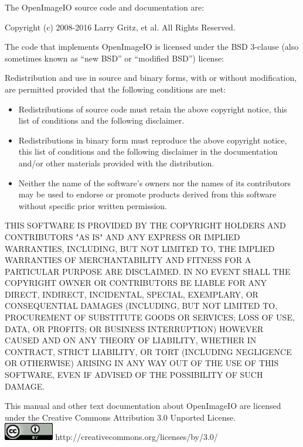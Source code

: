 \newpage
\label{speccopyr}

\vspace*{0.2in}

\noindent The OpenImageIO source code and
documentation are:

\vspace*{0.2in}

\noindent Copyright (c) 2008-2016 Larry Gritz, et al.
All Rights Reserved.

\vspace{0.5in}

The code that implements OpenImageIO is licensed under
the BSD 3-clause (also sometimes known as ``new BSD'' or
``modified BSD'') license:

\vspace{0.25in}

Redistribution and use in source and binary forms, with or without
modification, are permitted provided that the following conditions are
met:

\begin{itemize}
\item Redistributions of source code must retain the above copyright
  notice, this list of conditions and the following disclaimer.
\item Redistributions in binary form must reproduce the above copyright
  notice, this list of conditions and the following disclaimer in the
  documentation and/or other materials provided with the distribution.
\item Neither the name of the software's owners nor the names of its
  contributors may be used to endorse or promote products derived from
  this software without specific prior written permission.
\end{itemize}

THIS SOFTWARE IS PROVIDED BY THE COPYRIGHT HOLDERS AND CONTRIBUTORS
"AS IS" AND ANY EXPRESS OR IMPLIED WARRANTIES, INCLUDING, BUT NOT
LIMITED TO, THE IMPLIED WARRANTIES OF MERCHANTABILITY AND FITNESS FOR
A PARTICULAR PURPOSE ARE DISCLAIMED. IN NO EVENT SHALL THE COPYRIGHT
OWNER OR CONTRIBUTORS BE LIABLE FOR ANY DIRECT, INDIRECT, INCIDENTAL,
SPECIAL, EXEMPLARY, OR CONSEQUENTIAL DAMAGES (INCLUDING, BUT NOT
LIMITED TO, PROCUREMENT OF SUBSTITUTE GOODS OR SERVICES; LOSS OF USE,
DATA, OR PROFITS; OR BUSINESS INTERRUPTION) HOWEVER CAUSED AND ON ANY
THEORY OF LIABILITY, WHETHER IN CONTRACT, STRICT LIABILITY, OR TORT
(INCLUDING NEGLIGENCE OR OTHERWISE) ARISING IN ANY WAY OUT OF THE USE
OF THIS SOFTWARE, EVEN IF ADVISED OF THE POSSIBILITY OF SUCH DAMAGE.


\vspace{0.5in}

This manual and other text documentation about OpenImageIO
are licensed under the Creative Commons Attribution 3.0
Unported License. \\

\smallskip
\spc \includegraphics[width=0.85in]{figures/CC-30BY.png} 
\spc http://creativecommons.org/licenses/by/3.0/
 \bigskip 

